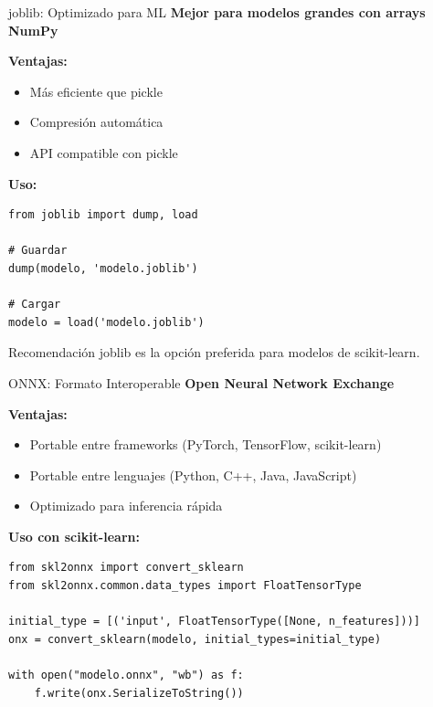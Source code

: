 \documentclass[aspectratio=169]{beamer}
\begin{document}
\begin{frame}[fragile]{joblib: Optimizado para ML}
\textbf{Mejor para modelos grandes con arrays NumPy}

\vspace{0.2cm}

\textbf{Ventajas:}
\begin{itemize}
\item Más eficiente que pickle
\item Compresión automática
\item API compatible con pickle
\end{itemize}

\vspace{0.3cm}

\textbf{Uso:}
\begin{verbatim}
from joblib import dump, load

# Guardar
dump(modelo, 'modelo.joblib')

# Cargar
modelo = load('modelo.joblib')
\end{verbatim}

\vspace{0.2cm}

\begin{block}{Recomendación}
joblib es la opción preferida para modelos de scikit-learn.
\end{block}
\end{frame}

\begin{frame}[fragile]{ONNX: Formato Interoperable}
\textbf{Open Neural Network Exchange}

\vspace{0.2cm}

\textbf{Ventajas:}
\begin{itemize}
\item Portable entre frameworks (PyTorch, TensorFlow, scikit-learn)
\item Portable entre lenguajes (Python, C++, Java, JavaScript)
\item Optimizado para inferencia rápida
\end{itemize}

\vspace{0.2cm}

\textbf{Uso con scikit-learn:}
\begin{verbatim}
from skl2onnx import convert_sklearn
from skl2onnx.common.data_types import FloatTensorType

initial_type = [('input', FloatTensorType([None, n_features]))]
onx = convert_sklearn(modelo, initial_types=initial_type)

with open("modelo.onnx", "wb") as f:
    f.write(onx.SerializeToString())
\end{verbatim}
\end{frame}
\end{document}
